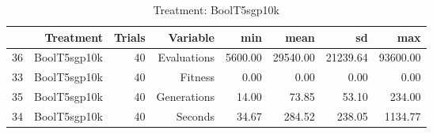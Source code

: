 \begin{table}[ht]
\centering
\begin{tabular}{rrrrrrrr}
  \hline
 & Treatment & Trials & Variable & min & mean & sd & max \\ 
  \hline
36 & BoolT5sgp10k &  40 & Evaluations & 5600.00 & 29540.00 & 21239.64 & 93600.00 \\ 
  33 & BoolT5sgp10k &  40 & Fitness & 0.00 & 0.00 & 0.00 & 0.00 \\ 
  35 & BoolT5sgp10k &  40 & Generations & 14.00 & 73.85 & 53.10 & 234.00 \\ 
  34 & BoolT5sgp10k &  40 & Seconds & 34.67 & 284.52 & 238.05 & 1134.77 \\ 
   \hline
\end{tabular}
\caption{Treatment: BoolT5sgp10k} 
\end{table}
